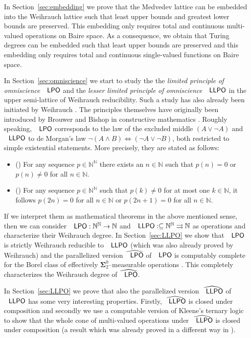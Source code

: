 \documentclass[jsl,10pt]{noasl}
\def\IN{{\mathbb{N}}}
\def\In{\subseteq}
\def\mto{\rightrightarrows}
\newcommand{\SO}[1]{{{\boldsymbol\Sigma}^0_{#1}}}
\def\LPO{\text{\rm\sffamily LPO}}
\def\LLPO{\text{\rm\sffamily LLPO}}
\def\LPO{\text{\rm\sffamily LPO}}
\def\LLPO{\text{\rm\sffamily LLPO}}
\begin{document}
In Section~\ref{sec:embedding} we prove that the Medvedev lattice can be embedded
into the Weihrauch lattice such that least upper bounds and greatest lower bounds
are preserved. This embedding only requires total and continuous multi-valued operations
on Baire space. As a consequence, we obtain that Turing degrees can be embedded such that
least upper bounds are preserved and this embedding only requires total and continuous
single-valued functions on Baire space.

In Section~\ref{sec:omniscience} we start to study the 
the {\em limited principle of omniscience} $\LPO$
and the {\em lesser limited principle of omniscience} $\LLPO$ in the 
upper semi-lattice of Weihrauch reducibility. Such a study has also
already been initiated by Weihrauch \cite{Wei92c}. The principles
themselves have originally been introduced by Brouwer and Bishop
in constructive mathematics \cite{BB85,BR87a}.
Roughly speaking, $\LPO$ corresponds to the law of the excluded middle $(A\vee\neg A)$ 
and $\LLPO$ to de Morgan's law $\neg (A\wedge B)\iff(\neg A\vee\neg B)$, both
restricted to simple existential statements. More precisely, they are stated as 
follows:

\begin{itemize}
\item (\LPO) For any sequence $p\in\IN^\IN$ there exists an $n\in\IN$ such that $p(n)=0$ or $p(n)\not=0$ for all $n\in\IN$.
\item (\LLPO) For any sequence $p\in\IN^\IN$ such that $p(k)\not=0$ for at most one $k\in\IN$, 
it follows $p(2n)=0$ for all $n\in\IN$ or $p(2n+1)=0$ for all $n\in\IN$.
\end{itemize}

If we interpret them as mathematical theorems in the above mentioned
sense, then we can consider $\LPO:\IN^\IN\to\IN$ and $\LLPO:\In\IN^\IN\mto\IN$
as operations and characterize their Weihrauch degree.
In Section~\ref{sec:LLPO} we show that $\LPO$ is strictly Weihrauch reducible to 
$\LLPO$ (which was also already proved by Weihrauch) and the parallelized
version $\widehat{\LPO}$ of $\LPO$ is computably complete for the Borel class
of effectively $\SO{2}$--measurable operations \cite{Bra05}. This completely characterizes
the Weihrauch degree of $\widehat{\LPO}$. 

In Section~\ref{sec:LLPO} we prove that also the parallelized version $\widehat{\LLPO}$ of $\LLPO$
has some very interesting properties. Firstly, $\widehat{\LLPO}$ is closed
under composition and secondly we use a computable version of Kleene's 
ternary logic to show that the whole cone of multi-valued operations under $\widehat{\LLPO}$
is closed under composition (a result which was already proved in a different way in \cite{GM09}).
\end{document}
